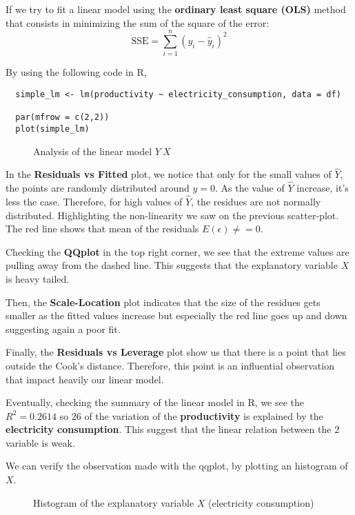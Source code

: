 \documentclass[10pt, a4paper, nofootinbib]{scrartcl}
\begin{document}
If we try to fit a linear model using the \textbf{ordinary least square (OLS)} method that consists in minimizing the sum of the square of the error: 
\begin{equation}
  \text{SSE} = \sum_{i = 1}^{n} (y_i - \hat{y}_i)^2
\end{equation}

By using the following code in R, 
\begin{verbatim}
  simple_lm <- lm(productivity ~ electricity_consumption, data = df)

  par(mfrow = c(2,2))
  plot(simple_lm)
\end{verbatim}

\begin{figure}[H]
  \centering
  
  \caption{Analysis of the linear model $Y ~ X$}
  \label{fig:analysis-linear-model}
\end{figure}

In the \textbf{Residuals vs Fitted} plot, we notice that only for the small values of $\hat{Y}$, the points are randomly distributed around $y = 0$. As the value of $\hat{Y}$ increase, it's less the case. Therefore, for high values of $\hat{Y}$, the residues are not normally distributed. Highlighting the non-linearity we saw on the previous scatter-plot. The red line shows that mean of the residuals $E(\epsilon) \neq = 0$.

Checking the \textbf{QQplot} in the top right corner, we see that the extreme values are pulling away from the dashed line. This suggests that the explanatory variable $X$ is heavy tailed. 

Then, the \textbf{Scale-Location} plot indicates that the size of the residues gets smaller as the fitted values increase but especially the red line goes up and down suggesting again a poor fit.

Finally, the \textbf{Residuals vs Leverage} plot show us that there is a point that lies outside the Cook's distance. Therefore, this point is an influential observation that impact heavily our linear model.

Eventually, checking the summary of the linear model in R, we see the $R^2 = 0.2614$ so $26$ of the variation of the \textbf{productivity} is explained by the \textbf{electricity consumption}. This suggest that the linear relation between the 2 variable is weak.

We can verify the observation made with the qqplot, by plotting an histogram of $X$. 
\begin{figure}[H]
  \centering
  
  \caption{Histogram of the explanatory variable $X$ (electricity consumption)}
  \label{fig:histogram-explanatory-variable}
\end{figure}
\end{document}
